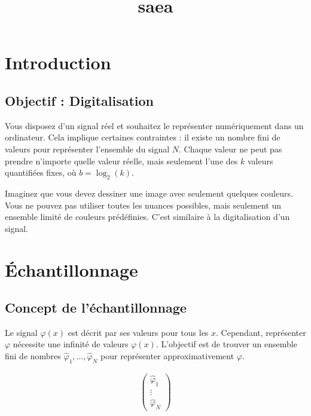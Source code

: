 \documentclass[12pt]{article}
\title{saea}
\author{}
\date{}
\begin{document}
\maketitle
\tableofcontents
\newpage

\section{Introduction}

\subsection{Objectif : Digitalisation}

Vous disposez d'un signal réel et souhaitez le représenter numériquement dans un ordinateur. Cela implique certaines contraintes : il existe un nombre fini de valeurs pour représenter l'ensemble du signal $N$. Chaque valeur ne peut pas prendre n'importe quelle valeur réelle, mais seulement l'une des $k$ valeurs quantifiées fixes, où $b = \log_2(k)$.


\begin{tcolorbox}[title={Vulgarisation simple}]
Imaginez que vous devez dessiner une image avec seulement quelques couleurs. Vous ne pouvez pas utiliser toutes les nuances possibles, mais seulement un ensemble limité de couleurs prédéfinies. C'est similaire à la digitalisation d'un signal.
\end{tcolorbox}

\newpage

\section{Échantillonnage}

\subsection{Concept de l'échantillonnage}

Le signal $\varphi(x)$ est décrit par ses valeurs pour tous les $x$. Cependant, représenter $\varphi$ nécessite une infinité de valeurs $\varphi(x)$. L'objectif est de trouver un ensemble fini de nombres $\hat{\varphi}_1, \ldots, \hat{\varphi}_N$ pour représenter approximativement $\varphi$.

\begin{align*}
\begin{pmatrix}
\hat{\varphi}_1 \\
\vdots \\
\hat{\varphi}_N
\end{pmatrix}
\end{align*}
\end{document}
